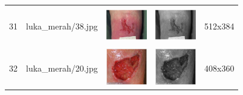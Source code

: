 \begin{table}[H]
\begin{tabular}{|m{0.2in}|m{1.2in}|m{0.7in}|m{0.7in}|m{0.7in}|}
		& &  &  &\\
		31& 
		luka\_merah/38.jpg &
		\includegraphics[width=0.7in]{dataset/dataset_3/luka_merah/ready/38.jpg}&
		\includegraphics[width=0.7in]{dataset/dataset_3/luka_merah/ready/38_gray.jpg}&
		512x384\\
		\hline
		
		& &  &  &\\
		32& 
		luka\_merah/20.jpg &
		\includegraphics[width=0.7in]{dataset/dataset_3/luka_merah/ready/20.jpg}&
		\includegraphics[width=0.7in]{dataset/dataset_3/luka_merah/ready/20_gray.jpg}&
		408x360\\
		\hline
	\end{tabular}
\end{table}



